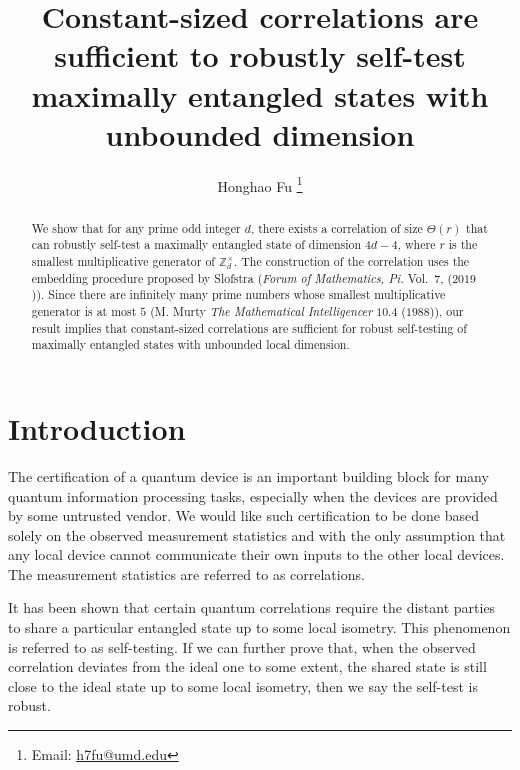 \documentclass[11pt,letterpaper]{article}
\newcommand{\Z}{\mathbb{Z}}
\newcommand{\Zd}{\Z_d^{\times}}
\newcommand{\1}{\mathbb{1}}
\theoremstyle{definition}
\begin{document}
\title{Constant-sized correlations are sufficient to 
robustly self-test maximally entangled states with unbounded dimension}

\author{Honghao Fu
\footnote{Email: \href{mailto:h7fu@umd.edu}{h7fu@umd.edu}}}

\renewcommand\Affilfont{\itshape\small}


\date{}
\maketitle

\begin{abstract}
	We show that for any prime odd integer $d$, there exists a correlation of size $\Theta(r)$ 
	that can robustly self-test a maximally entangled state of dimension $4d-4$,
	where $r$ is the smallest multiplicative generator of $\Zd$.
	The construction of the correlation uses the embedding procedure
	proposed by Slofstra (\textit{Forum of Mathematics, Pi.} Vol.~$7$, ($2019$)).
	Since there are 
	infinitely many prime numbers whose smallest multiplicative generator
	is at most $5$ (M. Murty \textit{The Mathematical Intelligencer} $10.4$ ($1988$)), 
	our result implies that constant-sized correlations are sufficient for robust self-testing of maximally entangled states
	with unbounded local dimension.
\end{abstract}
\section{Introduction}
\label{sec:intro}
The certification of a quantum device is an important building block
for many quantum information processing tasks, especially
when the devices are provided by some untrusted vendor.
We would like such certification to be done based solely on
the observed measurement statistics and with the only assumption that
any local device cannot communicate their own
inputs to the other local devices. 
The measurement statistics are referred to as correlations.

It has been shown that certain quantum correlations require the distant parties to share
a particular entangled state up to some local isometry. 
This phenomenon is referred to as self-testing.  
If we can further prove that, when the observed correlation deviates 
from the ideal one to some extent, 
the shared state is still close to the ideal state up to some local isometry,
then we say the self-test is robust. 
\end{document}
